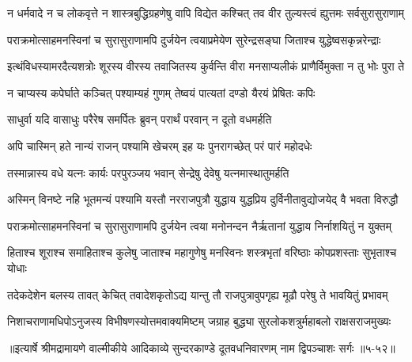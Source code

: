 \twolineshloka
{न धर्मवादे न च लोकवृत्ते न शास्त्रबुद्धिग्रहणेषु वापि}
{विद्येत कश्चित् तव वीर तुल्यस्त्वं ह्युत्तमः सर्वसुरासुराणाम्} %

\twolineshloka
{पराक्रमोत्साहमनस्विनां च सुरासुराणामपि दुर्जयेन}
{त्वयाप्रमेयेण सुरेन्द्रसङ्घा जिताश्च युद्धेष्वसकृन्नरेन्द्राः} %

\twolineshloka
{इत्थंविधस्यामरदैत्यशत्रोः शूरस्य वीरस्य तवाजितस्य}
{कुर्वन्ति वीरा मनसाप्यलीकं प्राणैर्विमुक्ता न तु भोः पुरा ते} %

\twolineshloka
{न चाप्यस्य कपेर्घाते कञ्चित् पश्याम्यहं गुणम्}
{तेष्वयं पात्यतां दण्डो यैरयं प्रेषितः कपिः} %

\twolineshloka
{साधुर्वा यदि वासाधुः परैरेष समर्पितः}
{ब्रुवन् परार्थं परवान् न दूतो वधमर्हति} %

\twolineshloka
{अपि चास्मिन् हते नान्यं राजन् पश्यामि खेचरम्}
{इह यः पुनरागच्छेत् परं पारं महोदधेः} %

\twolineshloka
{तस्मान्नास्य वधे यत्नः कार्यः परपुरञ्जय}
{भवान् सेन्द्रेषु देवेषु यत्नमास्थातुमर्हति} %

\twolineshloka
{अस्मिन् विनष्टे नहि भूतमन्यं पश्यामि यस्तौ नरराजपुत्रौ}
{युद्धाय युद्धप्रिय दुर्विनीतावुद्योजयेद् वै भवता विरुद्धौ} %

\twolineshloka
{पराक्रमोत्साहमनस्विनां च सुरासुराणामपि दुर्जयेन}
{त्वया मनोनन्दन नैर्ऋतानां युद्धाय निर्नाशयितुं न युक्तम्} %

\twolineshloka
{हिताश्च शूराश्च समाहिताश्च कुलेषु जाताश्च महागुणेषु}
{मनस्विनः शस्त्रभृतां वरिष्ठाः कोपप्रशस्ताः सुभृताश्च योधाः} %

\twolineshloka
{तदेकदेशेन बलस्य तावत् केचित् तवादेशकृतोऽद्य यान्तु}
{तौ राजपुत्रावुपगृह्य मूढौ परेषु ते भावयितुं प्रभावम्} %

\twolineshloka
{निशाचराणामधिपोऽनुजस्य विभीषणस्योत्तमवाक्यमिष्टम्}
{जग्राह बुद्ध्या सुरलोकशत्रुर्महाबलो राक्षसराजमुख्यः} %


॥इत्यार्षे श्रीमद्रामायणे वाल्मीकीये आदिकाव्ये सुन्दरकाण्डे दूतवधनिवारणम् नाम द्विपञ्चाशः सर्गः ॥५-५२॥
